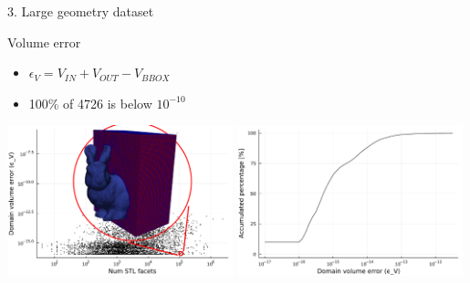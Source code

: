 \documentclass{beamer}
\begin{document}
\begin{frame}{3. Large geometry dataset}

  \begin{block}{Volume error}
  \begin{itemize}
    \item
      $\epsilon_V = V_{IN} + V_{OUT} - V_{BBOX}$
    \item
      100\% of 4726 is below $10^{-10}$
  \end{itemize}
  \end{block}

  \includegraphics[width=0.49\textwidth]{num_stl_facets_volume_error_bunny}
  \includegraphics[width=0.49\textwidth]{../analysis/plots/histogram_volume_error}
\end{frame}
\end{document}
